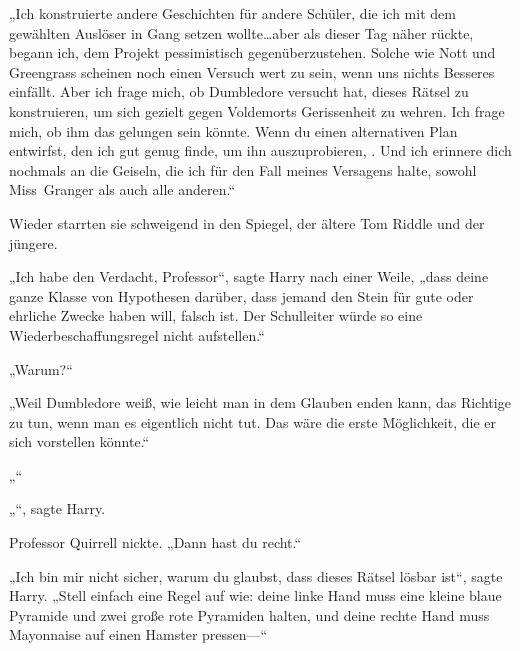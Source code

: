 „Ich konstruierte andere Geschichten für andere Schüler, die ich mit dem gewählten Auslöser in Gang setzen wollte…aber als dieser Tag näher rückte, begann ich, dem Projekt pessimistisch gegenüberzustehen. Solche wie Nott und Greengrass scheinen noch einen Versuch wert zu sein, wenn uns nichts Besseres einfällt. Aber ich frage mich, ob Dumbledore versucht hat, dieses Rätsel zu konstruieren, um sich gezielt gegen Voldemorts Gerissenheit zu wehren. Ich frage mich, ob ihm das gelungen sein könnte. Wenn du einen alternativen Plan entwirfst, den ich gut genug finde, um ihn auszuprobieren, . Und ich erinnere dich nochmals an die Geiseln, die ich für den Fall meines Versagens halte, sowohl Miss~Granger als auch alle anderen.“

Wieder starrten sie schweigend in den Spiegel, der ältere Tom Riddle und der jüngere.

„Ich habe den Verdacht, Professor“, sagte Harry nach einer Weile, „dass deine ganze Klasse von Hypothesen darüber, dass jemand den Stein für gute oder ehrliche Zwecke haben will, falsch ist. Der Schulleiter würde so eine Wiederbeschaffungsregel nicht aufstellen.“

„Warum?“

„Weil Dumbledore weiß, wie leicht man in dem Glauben enden kann, das Richtige zu tun, wenn man es eigentlich nicht tut. Das wäre die erste Möglichkeit, die er sich vorstellen könnte.“

„“

„“, sagte Harry.

Professor Quirrell nickte.
„Dann hast du recht.“

„Ich bin mir nicht sicher, warum du glaubst, dass dieses Rätsel lösbar ist“, sagte Harry. „Stell einfach eine Regel auf wie: deine linke Hand muss eine kleine blaue Pyramide und zwei große rote Pyramiden halten, und deine rechte Hand muss Mayonnaise auf einen Hamster pressen—“

